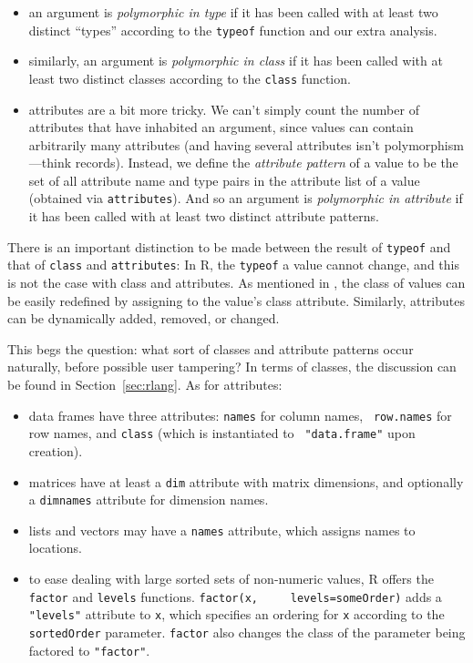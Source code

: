 \documentclass[acmsmall,10pt,review,anonymous]{acmart}\settopmatter{printfolios=true,printccs=false,printacmref=false}
\newcommand{\code}[1]{\lstinline|#1|\xspace}
\begin{document}
\begin{itemize}
\item an argument is {\it polymorphic in type} if it has been called with at
  least two distinct ``types'' according to the \code{typeof} function and
  our extra analysis.
\item similarly, an argument is {\it polymorphic in class} if it has been
  called with at least two distinct classes according to the \code{class}
  function.
	
\item attributes are a bit more tricky.  We can't simply count the number of
  attributes that have inhabited an argument, since values can contain
  arbitrarily many attributes (and having several attributes isn't
  polymorphism---think records).  Instead, we define the {\it attribute
    pattern} of a value to be the set of all attribute name and type pairs
  in the attribute list of a value (obtained via \code{attributes}).  And so
  an argument is {\it polymorphic in attribute} if it has been called with
  at least two distinct attribute patterns.

\end{itemize}

There is an important distinction to be made between the result of
\code{typeof} and that of \code{class} and \code{attributes}: In R, the
\code{typeof} a value cannot change, and this is not the case with class and
attributes.  As mentioned in , the class of values
can be easily redefined by assigning to the value's class attribute.
Similarly, attributes can be dynamically added, removed, or changed.

This begs the question: what sort of classes and attribute patterns occur
naturally, before possible user tampering?  In terms of classes, the
discussion can be found in Section~\ref{sec:rlang}.  As for attributes:

\begin{itemize}

\item data frames have three attributes: {\tt names} for column names, {\tt
  row.names} for row names, and {\tt class} (which is instantiated to {\tt
  "data.frame"} upon creation).
	
\item matrices have at least a {\tt dim} attribute with matrix dimensions,
  and optionally a {\tt dimnames} attribute for dimension names.

\item lists and vectors may have a {\tt names} attribute, which assigns
  names to locations.
	
\item to ease dealing with large sorted sets of non-numeric values, R offers
  the \code{factor} and \code{levels} functions.  \code{factor(x,
    levels=someOrder)} adds a {\tt "levels"} attribute to \code{x}, which
  specifies an ordering for \code{x} according to the \code{sortedOrder}
  parameter.  \code{factor} also changes the class of the parameter being
  factored to \texttt{"factor"}.

\end{itemize}
\end{document}
